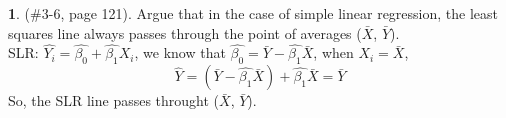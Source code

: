 \documentclass[12pt,fleqn]{article}\usepackage[]{graphicx}\usepackage[]{color}
\theoremstyle{definition}
\newtheorem{problem}{}
\begin{document}
	\begin{problem} (\#3-6, page 121). Argue that in the case of simple linear regression, the least squares line always passes through the point of averages ($\bar{X}$, $\bar{Y}$).\\[5pt]
	SLR: $\hat{Y_i} = \hat{\beta_0} + \hat{\beta_1}X_i$, we know that $\hat{\beta_0} = \bar{Y} - \hat{\beta_1}\bar{X}$, when $X_i = \bar{X}$,
	$$\hat{Y} = (\bar{Y} - \hat{\beta_1}\bar{X}) + \hat{\beta_1}\bar{X} = \bar{Y}$$
	So, the SLR line passes throught ($\bar{X}$, $\bar{Y}$).
	\end{problem}
\end{document}
